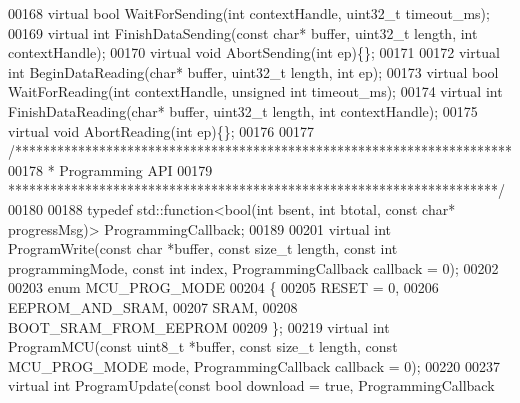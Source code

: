 \begin{DoxyCode}
00168     \textcolor{keyword}{virtual} \textcolor{keywordtype}{bool} WaitForSending(\textcolor{keywordtype}{int} contextHandle, uint32\_t timeout_ms);
00169     \textcolor{keyword}{virtual} \textcolor{keywordtype}{int} FinishDataSending(\textcolor{keyword}{const} \textcolor{keywordtype}{char}* buffer, uint32\_t length, \textcolor{keywordtype}{int} contextHandle);
00170     \textcolor{keyword}{virtual} \textcolor{keywordtype}{void} AbortSending(\textcolor{keywordtype}{int} ep)\{\};
00171     
00172     \textcolor{keyword}{virtual} \textcolor{keywordtype}{int} BeginDataReading(\textcolor{keywordtype}{char}* buffer, uint32\_t length, \textcolor{keywordtype}{int} ep);
00173     \textcolor{keyword}{virtual} \textcolor{keywordtype}{bool} WaitForReading(\textcolor{keywordtype}{int} contextHandle, \textcolor{keywordtype}{unsigned} \textcolor{keywordtype}{int} timeout\_ms);
00174     \textcolor{keyword}{virtual} \textcolor{keywordtype}{int} FinishDataReading(\textcolor{keywordtype}{char}* buffer, uint32\_t length, \textcolor{keywordtype}{int} contextHandle);
00175     \textcolor{keyword}{virtual} \textcolor{keywordtype}{void} AbortReading(\textcolor{keywordtype}{int} ep)\{\};
00176     
00177     \textcolor{comment}{/***********************************************************************}
00178 \textcolor{comment}{     * Programming API}
00179 \textcolor{comment}{     **********************************************************************/}
00180 
00188     \textcolor{keyword}{typedef} std::function<bool(int bsent, int btotal, const char* progressMsg)> 
      ProgrammingCallback;
00189 
00201     \textcolor{keyword}{virtual} \textcolor{keywordtype}{int} ProgramWrite(\textcolor{keyword}{const} \textcolor{keywordtype}{char} *buffer, \textcolor{keyword}{const} \textcolor{keywordtype}{size\_t} length, \textcolor{keyword}{const} \textcolor{keywordtype}{int} programmingMode, \textcolor{keyword}{const} \textcolor{keywordtype}{int} 
      index, ProgrammingCallback callback = 0);
00202 
00203     \textcolor{keyword}{enum} MCU_PROG_MODE
00204     \{
00205         RESET = 0,
00206         EEPROM_AND_SRAM,
00207         SRAM,
00208         BOOT\_SRAM\_FROM\_EEPROM
00209     \};
00219     \textcolor{keyword}{virtual} \textcolor{keywordtype}{int} ProgramMCU(\textcolor{keyword}{const} uint8\_t *buffer, \textcolor{keyword}{const} \textcolor{keywordtype}{size\_t} length, \textcolor{keyword}{const} 
      MCU_PROG_MODE mode, ProgrammingCallback callback = 0);
00220 
00237     \textcolor{keyword}{virtual} \textcolor{keywordtype}{int} ProgramUpdate(\textcolor{keyword}{const} \textcolor{keywordtype}{bool} download = \textcolor{keyword}{true}, ProgrammingCallback 

\end{DoxyCode}
